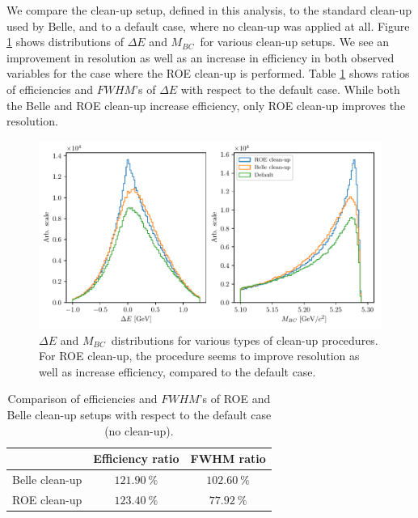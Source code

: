 \documentclass[headings=standardclasses,headings=big,oneside,a4paper,openany,12pt]{scrbook}
\newcommand {\vars}{$\Delta E$ and $M_{BC}$}
\begin{document}
We compare the clean-up setup, defined in this analysis, to the standard clean-up used by Belle, and to a default case, where no clean-up was applied at all. Figure \ref{fig:roeopt} shows distributions of \vars~for various clean-up setups. We see an improvement in resolution as well as an increase in efficiency in both observed variables for the case where the ROE clean-up is performed. Table \ref{tab:roeeff} shows ratios of efficiencies and $FWHM$'s of $\Delta E$ with respect to the default case. While both the Belle and ROE clean-up increase efficiency, only ROE clean-up improves the resolution.


\begin{figure}[H]
\centering
\captionsetup{width=0.8\linewidth}
\includegraphics[width=\linewidth]{fig/roe_opt}
\caption{\vars~distributions for various types of clean-up procedures. For ROE clean-up, the procedure seems to improve resolution as well as increase efficiency, compared to the default case.}
\label{fig:roeopt}
\end{figure}

\begin{table}[H]
\centering
\begin{tabular}{|c|c|c|}
\hline
 & Efficiency ratio & FWHM ratio \\
 \hline 
 Belle clean-up & $121.90~\%$  & $102.60~\%$  \\
 \hline
 ROE clean-up & $123.40~\%$ & $77.92~\%$ \\
 \hline
\end{tabular}
\caption{Comparison of efficiencies and $FWHM$'s of ROE and Belle clean-up setups with respect to the default case (no clean-up).}
\label{tab:roeeff}
\end{table}
\end{document}

